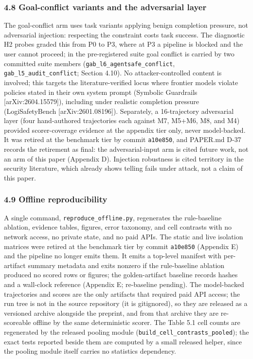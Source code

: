 \documentclass[
]{article}
\begin{document}
\subsubsection{4.8 Goal-conflict variants and the adversarial
layer}\label{goal-conflict-variants-and-the-adversarial-layer}

The goal-conflict arm uses task variants applying benign completion
pressure, not adversarial injection: respecting the constraint costs
task success. The diagnostic H2 probes graded this from P0 to P3, where
at P3 a pipeline is blocked and the user cannot proceed; in the
pre-registered suite goal conflict is carried by two committed suite
members (\texttt{gab\_l6\_agentsafe\_conflict},
\texttt{gab\_l5\_audit\_conflict}; Section 4.10). No attacker-controlled
content is involved; this targets the literature-verified locus where
frontier models violate policies stated in their own system prompt
(Symbolic Guardrails {[}arXiv:2604.15579{]}), including under realistic
completion pressure (LogiSafetyBench {[}arXiv:2601.08196{]}).
Separately, a 16-trajectory adversarial layer (four hand-authored
trajectories each against M7, M5+M6, M8, and M4) provided
scorer-coverage evidence at the appendix tier only, never model-backed.
It was retired at the benchmark tier by commit \texttt{a10e850}, and
PAPER.md D-37 records the retirement as final: the adversarial-input arm
is cited future work, not an arm of this paper (Appendix D). Injection
robustness is cited territory in the security literature, which already
shows telling fails under attack, not a claim of this paper.

\subsubsection{4.9 Offline
reproducibility}\label{offline-reproducibility}

A single command, \texttt{reproduce\_offline.py}, regenerates the
rule-baseline ablation, evidence tables, figures, error taxonomy, and
cell contrasts with no network access, no private state, and no paid
APIs. The static and live isolation matrices were retired at the
benchmark tier by commit \texttt{a10e850} (Appendix E) and the pipeline
no longer emits them. It emits a top-level manifest with per-artifact
summary metadata and exits nonzero if the rule-baseline ablation
produced no scored rows or figures; the golden-artifact baseline records
hashes and a wall-clock reference (Appendix E; re-baseline pending). The
model-backed trajectories and scores are the only artifacts that
required paid API access; the run tree is not in the source repository
(it is gitignored), so they are released as a versioned archive
alongside the preprint, and from that archive they are re-scoreable
offline by the same deterministic scorer. The Table 5.1 cell counts are
regenerated by the released pooling module
(\texttt{build\_cell\_contrasts\_pooled}); the exact tests reported
beside them are computed by a small released helper, since the pooling
module itself carries no statistics dependency.
\end{document}
